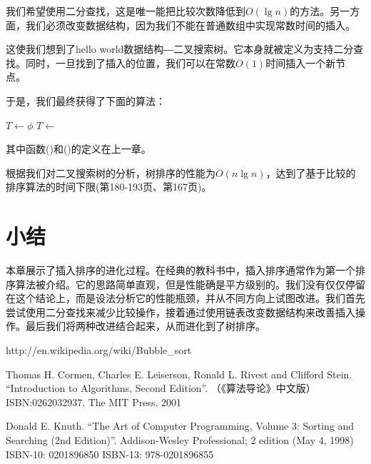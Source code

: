 \documentclass{ctexart}
\begin{document}
我们希望使用二分查找，这是唯一能把比较次数降低到$O(\lg n)$的方法。另一方面，我们必须改变数据结构，因为我们不能在普通数组中实现常数时间的插入。

这使我们想到了hello world数据结构―二叉搜索树。它本身就被定义为支持二分查找。同时，一旦找到了插入的位置，我们可以在常数$O(1)$时间插入一个新节点。

于是，我们最终获得了下面的算法：

\begin{algorithmic}[1]
  \State $T \gets \phi$
    \State $T \gets $ 
  \EndFor
  \State \Return {}
\EndFunction
\end{algorithmic}

其中函数()和()的定义在上一章。

根据我们对二叉搜索树的分析，树排序的性能为$O(n \lg n)$，达到了基于比较的排序算法的时间下限(\cite{Knuth-V3}第180-193页、\cite{CLRS}第167页)。

\section{小结}
本章展示了插入排序的进化过程。在经典的教科书中，插入排序通常作为第一个排序算法被介绍。它的思路简单直观，但是性能确是平方级别的。我们没有仅仅停留在这个结论上，而是设法分析它的性能瓶颈，并从不同方向上试图改进。我们首先尝试使用二分查找来减少比较操作，接着通过使用链表改变数据结构来改善插入操作。最后我们将两种改进结合起来，从而进化到了树排序。

\ifx\wholebook\relax \else
\begin{thebibliography}{99}

http://en.wikipedia.org/wiki/Bubble\_sort

Thomas H. Cormen, Charles E. Leiserson, Ronald L. Rivest and Clifford Stein.
``Introduction to Algorithms, Second Edition''. （《算法导论》中文版）ISBN:0262032937. The MIT Press. 2001

Donald E. Knuth. ``The Art of Computer Programming, Volume 3: Sorting and Searching (2nd Edition)''. Addison-Wesley Professional; 2 edition (May 4, 1998) ISBN-10: 0201896850 ISBN-13: 978-0201896855

\end{thebibliography}
\end{document}
